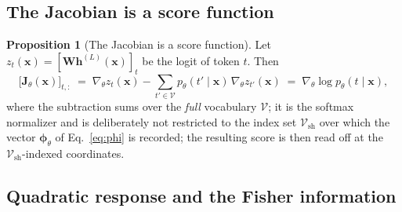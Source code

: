 \documentclass[11pt]{article}
\newcommand{\V}{\mathcal{V}}
\newcommand{\Vsh}{\mathcal{V}_{\mathrm{sh}}}
\theoremstyle{definition}
\newtheorem{proposition}{Proposition}
\begin{document}
\subsection{The Jacobian is a score function}
\label{sec:app-score}

\begin{proposition}[The Jacobian is a score function]
\label{prop:score}
Let $z_t(\bm{x}) = [\bm{W}\bm{h}^{(L)}(\bm{x})]_t$ be the logit of token $t$.
Then
\begin{equation}
  \big[\bm{J}_\theta(\bm{x})\big]_{t,:} \;=\;
  \nabla_\theta z_t(\bm{x}) - \sum_{t' \in \V} p_\theta(t' \mid \bm{x})\,\nabla_\theta z_{t'}(\bm{x})
  \;=\; \nabla_\theta \log p_\theta(t \mid \bm{x}),
  \label{eq:score}
\end{equation}
where the subtraction sums over the \emph{full} vocabulary $\V$; it is the
softmax normalizer and is deliberately not restricted to the index set $\Vsh$
over which the vector $\bm{\phi}_\theta$ of Eq.~\eqref{eq:phi} is recorded; the
resulting score is then read off at the $\Vsh$-indexed coordinates.
\end{proposition}

\subsection{Quadratic response and the Fisher information}
\label{sec:app-fisher}
\end{document}
